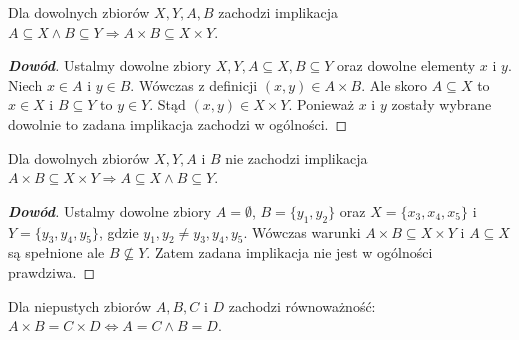 \begin{property}
Dla dowolnych zbiorów $X,Y,A, B$ zachodzi implikacja
$A\subseteq X\wedge B\subseteq Y\Rightarrow A\times B\subseteq X\times Y$.
\end{property}
\begin{proof}[\textbf{Dowód}]
Ustalmy dowolne zbiory $X,Y,A\subseteq X, B\subseteq Y$ oraz dowolne elementy $x$ i $y$. Niech
$x\in A$ i $y\in B$. Wówczas z definicji $(x,y)\in A\times B$. Ale skoro $A\subseteq X$ to $x\in X$ i $B\subseteq Y$ to $y\in Y$. Stąd $(x,y)\in X\times Y$. Ponieważ $x$ i $y$ zostały wybrane dowolnie to zadana implikacja zachodzi w ogólności.
\end{proof}
\begin{property}
Dla dowolnych zbiorów $X,Y, A$ i $B$ nie zachodzi implikacja $A\times B\subseteq X\times Y\Rightarrow A\subseteq X\wedge B\subseteq Y$.
\end{property}
\begin{proof}[\textbf{Dowód}]
Ustalmy dowolne zbiory $A=\emptyset$, $B=\{y_{1},y_{2}\}$ oraz $X=\{x_{3},x_{4},x_{5}\}$ i $Y=\{y_{3},y_{4},y_{5}\}$, gdzie $y_{1},y_{2}\ne y_{3},y_{4},y_{5}$. Wówczas warunki $A\times B\subseteq X\times Y$ i $A\subseteq X$ są spełnione ale $B\not\subseteq Y$. Zatem zadana implikacja nie jest w ogólności prawdziwa.
\end{proof}
\begin{property}
Dla niepustych zbiorów $A,B,C$ i $D$ zachodzi równoważność:
$A\times B=C\times D\Leftrightarrow A=C\wedge B=D$.
\end{property}
